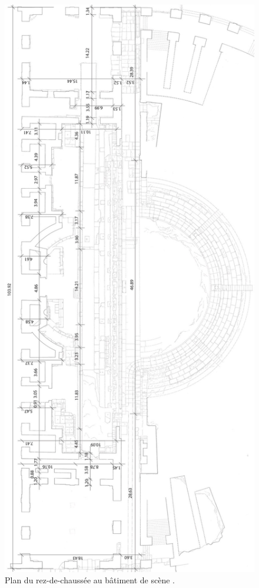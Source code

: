 \begin{figure}[!h]
	\includegraphics[height=0.8\paperheight]{images/cotes}
	\caption[Plan du rez-de-chaussée au bâtiment de scène.]{Plan du rez-de-chaussée au bâtiment de scène \cite[Pl. XXI]{orangePl}.}
	\label{cotes} 
\end{figure} 

